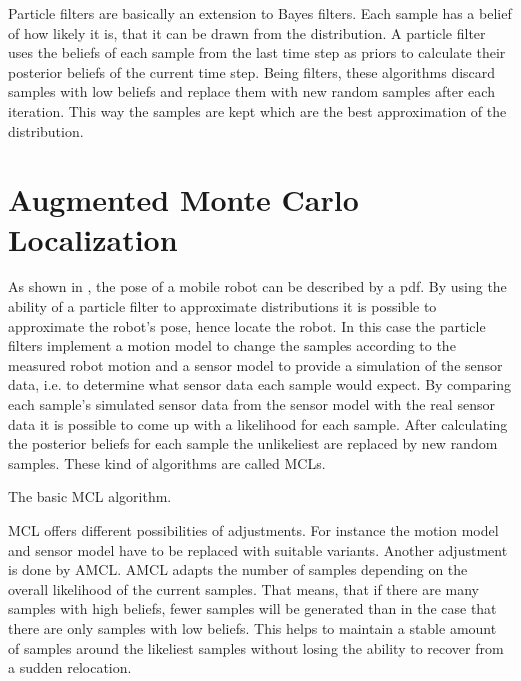 \documentclass[Thesis.tex]{subfiles}
\begin{document}
Particle filters are basically an extension to Bayes filters. Each sample has a belief of how likely it is, that it can be drawn from the distribution. A particle filter uses the beliefs of each sample from the last time step as priors to calculate their posterior beliefs of the current time step. Being filters, these algorithms discard samples with low beliefs and replace them with new random samples after each iteration\cite{ThrunBurgardFox:2005}. This way the samples are kept which are the best approximation of the distribution.

\section{Augmented Monte Carlo Localization}
As shown in , the pose of a mobile robot can be described by a \gls{pdf}. By using the ability of a particle filter to approximate distributions it is possible to approximate the robot's pose, hence locate the robot. In this case the particle filters implement a motion model to change the samples according to the measured robot motion and a sensor model to provide a simulation of the sensor data, i.e. to determine what sensor data each sample would expect. By comparing each sample's simulated sensor data from the sensor model with the real sensor data it is possible to come up with a likelihood for each sample. After calculating the posterior beliefs for each sample the unlikeliest are replaced by new random samples. These kind of algorithms are called \glspl{MCL}.

\begin{algorithm}
\label{alg:mcl}
\caption[\acrlong{MCL}]{The basic \gls{MCL} algorithm.}
\end{algorithm}

\gls{MCL} offers different possibilities of adjustments. For instance the motion model and sensor model have to be replaced with suitable variants. Another adjustment is done by \gls{AMCL}. \gls{AMCL} adapts the number of samples depending on the overall likelihood of the current samples. That means, that if there are many samples with high beliefs, fewer samples will be generated than in the case that there are only samples with low beliefs. This helps to maintain a stable amount of samples around the likeliest samples without losing the ability to recover from a sudden relocation\cite{ThrunBurgardFox:2005}.
\end{document}
